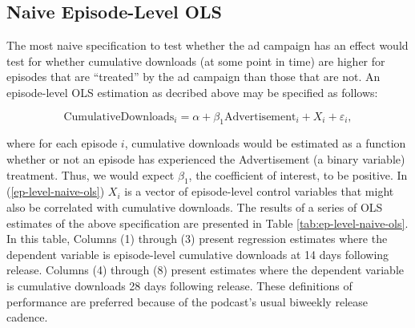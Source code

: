 \documentclass[11pt, letterpaper, twoside]{article}
\begin{document}
\subsection{Naive Episode-Level OLS}
The most naive specification to test whether the ad campaign has an effect would test for whether cumulative downloads (at some point in time) are higher for episodes that are ``treated'' by the ad campaign than those that are not. An episode-level OLS estimation as decribed above may be specified as follows:

\begin{equation}
  \label{ep-level-naive-ols}
  \text{CumulativeDownloads}_i = \alpha + \beta_1\text{Advertisement}_i + X_i +\varepsilon_i, 
\end{equation}

where for each episode $i$, cumulative downloads would be estimated as a function whether or not an episode has experienced the Advertisement (a binary variable) treatment. Thus, we would expect $\beta_1$, the coefficient of interest, to be positive. In (\ref{ep-level-naive-ols}) $X_i$ is a vector of episode-level control variables that might also be correlated with cumulative downloads. The results of a series of OLS estimates of the above specification are presented in Table \ref{tab:ep-level-naive-ols}. In this table, Columns (1) through (3) present regression estimates where the dependent variable is episode-level cumulative downloads at 14 days following release. Columns (4) through (8) present estimates where the dependent variable is cumulative downloads 28 days following release. These definitions of performance are preferred because of the podcast's usual biweekly release cadence.\\
\end{document}
